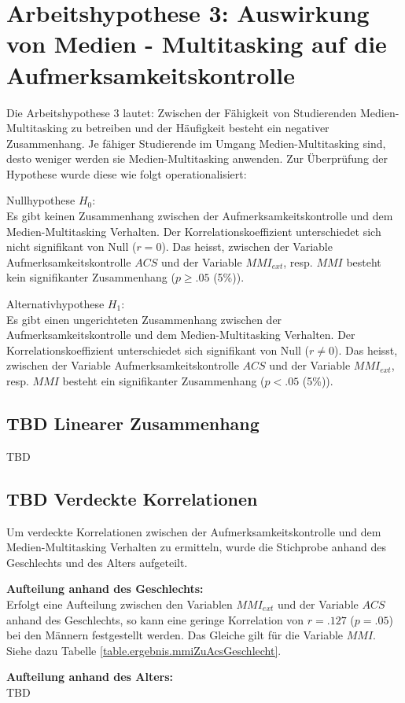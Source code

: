 \section{Arbeitshypothese 3: Auswirkung von Medien - Multitasking auf die Aufmerksamkeitskontrolle}\label{label.ergebnisse.arbeitshypothese3}
Die Arbeitshypothese 3 lautet: Zwischen der Fähigkeit von Studierenden Medien-Multitasking zu betreiben und der Häufigkeit besteht ein negativer Zusammenhang. Je fähiger Studierende im Umgang Medien-Multitasking sind, desto weniger werden sie Medien-Multitasking anwenden. Zur Überprüfung der Hypothese wurde diese wie folgt operationalisiert:\par
Nullhypothese $H_{0}$:\\
Es gibt keinen Zusammenhang zwischen der Aufmerksamkeitskontrolle und dem Medien-Multitasking Verhalten. Der Korrelationskoeffizient unterschiedet sich nicht signifikant von Null ($r=0$). Das heisst, zwischen der Variable Aufmerksamkeitskontrolle $ACS$ und der Variable $MMI_{ext}$, resp. $MMI$ besteht kein signifikanter Zusammenhang ($p \geq .05$ (5\%)).
\par
Alternativhypothese $H_{1}$:\\
Es gibt einen ungerichteten Zusammenhang zwischen der Aufmerksamkeitskontrolle und dem Medien-Multitasking Verhalten. Der Korrelationskoeffizient unterschiedet sich signifikant von Null ($r \neq 0$). Das heisst, zwischen der Variable Aufmerksamkeitskontrolle $ACS$ und der Variable $MMI_{ext}$, resp. $MMI$ besteht ein signifikanter Zusammenhang ($p < .05$ (5\%)).
\subsection{TBD Linearer Zusammenhang}
TBD
\subsection{TBD Verdeckte Korrelationen}
Um verdeckte Korrelationen zwischen der Aufmerksamkeitskontrolle und dem Medien-Multitasking Verhalten zu ermitteln, wurde die Stichprobe anhand des Geschlechts und des Alters aufgeteilt.
\par
\textbf{Aufteilung anhand des Geschlechts:}\\
Erfolgt eine Aufteilung zwischen den Variablen $MMI_{ext}$ und der Variable $ACS$ anhand des Geschlechts, so kann eine geringe Korrelation von $r=.127$ ($p=.05$) bei den Männern festgestellt werden. Das Gleiche gilt für die Variable $MMI$. Siehe dazu Tabelle \ref{table.ergebnis.mmiZuAcsGeschlecht}.
\par
\textbf{Aufteilung anhand des Alters:}\\
TBD

